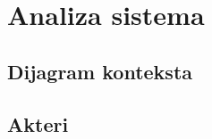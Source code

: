 \section{\bfseries Analiza sistema}

\subsection{\bfseries Dijagram konteksta}

\subsection{\bfseries Akteri}
